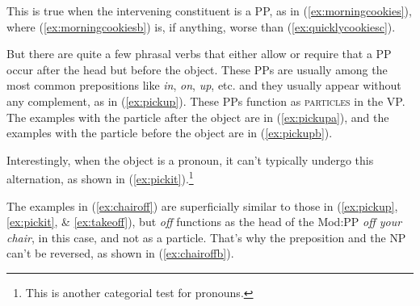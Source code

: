 \noindent
This is true when the intervening constituent  is a PP, as in  (\ref{ex:morningcookies}), where (\ref{ex:morningcookiesb}) is, if anything, worse than (\ref{ex:quicklycookiesc}).

\ea
    \label{ex:morningcookiesa}
    \label{ex:morningcookiesb}
    \label{ex:morningcookiesd}
    \z\label{ex:morningcookies}
\z

But there are quite a few phrasal verbs that either allow or require that a PP occur after the head but before the object. These PPs are usually among the most common prepositions like \textit{in}, \textit{on}, \textit{up}, etc. and they usually appear without any complement, as in (\ref{ex:pickup}). These PPs function as \textsc{particles} in the VP. The examples with the particle after the object are in (\ref{ex:pickupa}), and the examples with the particle before the object are in (\ref{ex:pickupb}).

\begin{multicols}{2}
\ea \label{ex:pickup}
    \ea \label{ex:pickupa}
    \z
    \ex \label{ex:pickupb}
        \z
    \z
\z
\end{multicols}

Interestingly, when the object is a pronoun, it can't typically undergo this alternation, as shown in (\ref{ex:pickit}).\footnote{This is another categorial test for pronouns.}

\begin{multicols}{2}
\ea \label{ex:pickit}
    \ea
    \z
    \ex
        \z
    \z
\z
\end{multicols}

The examples in (\ref{ex:chairoff}) are superficially similar to those in (\ref{ex:pickup}, \ref{ex:pickit}, \& \ref{ex:takeoff}), but \textit{off} functions as the head of the Mod:PP \textit{off your chair}, in this case, and not as a particle. That's why the preposition and the NP can't be reversed, as shown in (\ref{ex:chairoffb}).

